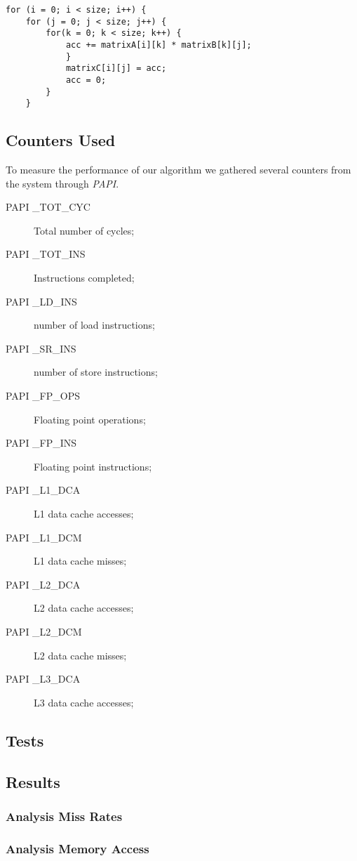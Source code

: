\documentclass[a4paper,10pt,openright,openbib]{article}
\begin{document}
\begin{verbatim}
for (i = 0; i < size; i++) {
    for (j = 0; j < size; j++) {
        for(k = 0; k < size; k++) {
            acc += matrixA[i][k] * matrixB[k][j];				
            }		
            matrixC[i][j] = acc;	
            acc = 0;
        }
    }
\end{verbatim}

\subsection{Counters Used}
To measure the performance of our algorithm we gathered several counters from the system through \emph{PAPI}.
\begin{description}
\item[PAPI \_TOT\_CYC] Total number of cycles;
\item[PAPI \_TOT\_INS] Instructions completed;
\item[PAPI \_LD\_INS] number of load instructions;
\item[PAPI \_SR\_INS] number of store instructions;
\item[PAPI \_FP\_OPS] Floating point operations;
\item[PAPI \_FP\_INS] Floating point instructions;
\item[PAPI \_L1\_DCA] L1 data cache accesses;
\item[PAPI \_L1\_DCM] L1 data cache misses;
\item[PAPI \_L2\_DCA] L2 data cache accesses;
\item[PAPI \_L2\_DCM] L2 data cache misses;
\item[PAPI \_L3\_DCA] L3 data cache accesses;
\end{description}

\subsection{Tests}
\subsection{Results}
\subsubsection{Analysis Miss Rates}
\subsubsection{Analysis Memory Access}
\end{document}

